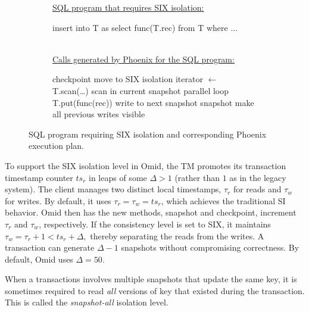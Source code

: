 \begin{figure}
\small
\begin{subfigure}[tb]{\columnwidth}
\underline{\hspace{\columnwidth}}
\underline{\small SQL program that requires SIX isolation:}
\begin{algorithmic}
\State insert into T as select func(T.rec) from T  where ... 
\EndFor
\end{algorithmic}
\end{subfigure}
\begin{subfigure}[tb]{\columnwidth}
\ \\
\underline{\small Calls generated by Phoenix for the SQL program:}
\begin{algorithmic}
\State checkpoint \Comment move to SIX isolation
\State iterator $\leftarrow$ T.scan(\dots) \Comment scan in current snapshot
 \Comment parallel loop
    \State T.put(func(rec)) \Comment write to next snapshot              
\EndFor
\State snapshot  \Comment make all previous writes visible
\EndFor
\end{algorithmic}
\underline{\hspace{\columnwidth}}
\end{subfigure}
\vspace{-0.3cm}
\caption{\small   SQL program requiring SIX isolation and corresponding Phoenix execution plan.}
\vspace{-0.5cm}
\label{alg:six}
\end{figure}

To support the SIX isolation level in Omid, the TM promotes its transaction timestamp counter $ts_r$ 
in leaps of some $\Delta > 1$ (rather than $1$ as in the legacy system).  The client manages 
two distinct local timestamps, $\tau_r$ for reads and $\tau_w$ for writes. By default, 
it uses  $\tau_r = \tau_w = ts_r$, which achieves the traditional SI behavior. Omid 
then has the new methods, snapshot and checkpoint, increment 
$\tau_r$ and $\tau_w$, respectively. If the consistency level is set to SIX, 
it maintains 
$\tau_w = \tau_r+1 < ts_r+\Delta,$
thereby separating the reads from the writes. 
A transaction can generate $\Delta-1$ snapshots without compromising
 correctness. By default, Omid uses $\Delta=50$.  

\vspace{-0.2cm}
When a transactions involves multiple snapshots that update the same key, 
it is sometimes required to read \emph{all} versions of key that existed 
during the transaction. This is called the \emph{snapshot-all} isolation level.

